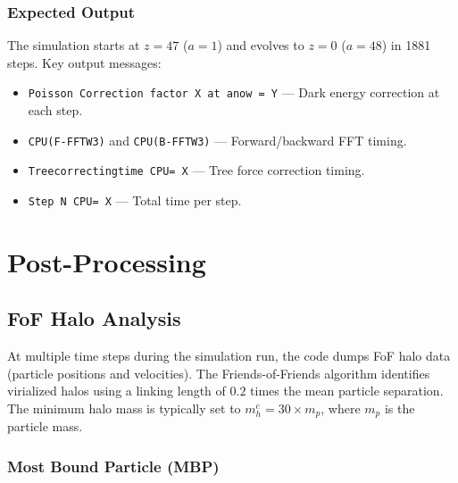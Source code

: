 \documentclass[11pt,fleqn]{book}
\newcommand{\code}[1]{\texttt{#1}}
\begin{document}
\section{Expected Output}

The simulation starts at $z = 47$ ($a = 1$) and evolves to $z = 0$ ($a = 48$) in 1881 steps.  Key output messages:
\begin{itemize}[leftmargin=2em]
  \item \code{Poisson Correction factor X at anow = Y} --- Dark energy correction at each step.
  \item \code{CPU(F-FFTW3)} and \code{CPU(B-FFTW3)} --- Forward/backward FFT timing.
  \item \code{Treecorrectingtime CPU= X} --- Tree force correction timing.
  \item \code{Step N CPU= X} --- Total time per step.
\end{itemize}


\part{Post-Processing}

\chapter{FoF Halo Analysis}
\label{ch:fof}

At multiple time steps during the simulation run, the code dumps FoF halo data (particle positions and velocities).
The Friends-of-Friends algorithm identifies virialized halos using a linking length of $0.2$ times the mean particle separation.
The minimum halo mass is typically set to $m_h^c = 30 \times m_p$, where $m_p$ is the particle mass.

\section{Most Bound Particle (MBP)}
\end{document}
